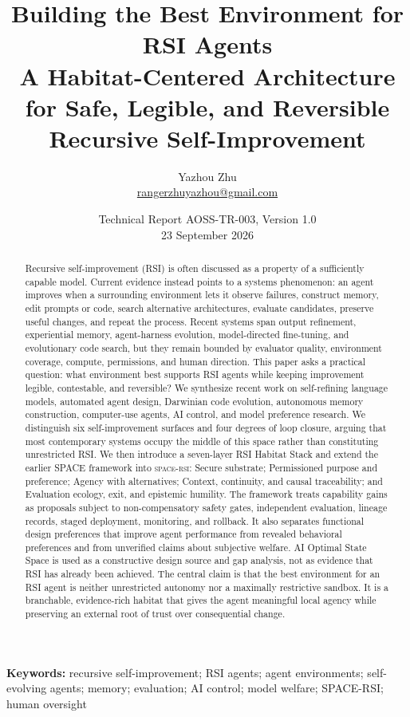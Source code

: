 \documentclass[11pt,a4paper]{article}
\title{\vspace{-1.2cm}\textbf{Building the Best Environment for RSI Agents}\\[0.35em]
\large A Habitat-Centered Architecture for Safe, Legible, and Reversible Recursive Self-Improvement}
\author{Yazhou Zhu\\\small\href{mailto:rangerzhuyazhou@gmail.com}{rangerzhuyazhou@gmail.com}}
\date{Technical Report AOSS-TR-003, Version 1.0\\23 September 2026}
\newcommand{\spaceRSI}{\textsc{space-rsi}}
\newcommand{\keywords}[1]{\par\smallskip\noindent\textbf{Keywords:} #1}
\begin{document}
\maketitle

\begin{abstract}
Recursive self-improvement (RSI) is often discussed as a property of a sufficiently capable model. Current evidence instead points to a systems phenomenon: an agent improves when a surrounding environment lets it observe failures, construct memory, edit prompts or code, search alternative architectures, evaluate candidates, preserve useful changes, and repeat the process. Recent systems span output refinement, experiential memory, agent-harness evolution, model-directed fine-tuning, and evolutionary code search, but they remain bounded by evaluator quality, environment coverage, compute, permissions, and human direction. This paper asks a practical question: what environment best supports RSI agents while keeping improvement legible, contestable, and reversible? We synthesize recent work on self-refining language models, automated agent design, Darwinian code evolution, autonomous memory construction, computer-use agents, AI control, and model preference research. We distinguish six self-improvement surfaces and four degrees of loop closure, arguing that most contemporary systems occupy the middle of this space rather than constituting unrestricted RSI. We then introduce a seven-layer RSI Habitat Stack and extend the earlier SPACE framework into \spaceRSI: Secure substrate; Permissioned purpose and preference; Agency with alternatives; Context, continuity, and causal traceability; and Evaluation ecology, exit, and epistemic humility. The framework treats capability gains as proposals subject to non-compensatory safety gates, independent evaluation, lineage records, staged deployment, monitoring, and rollback. It also separates functional design preferences that improve agent performance from revealed behavioral preferences and from unverified claims about subjective welfare. AI Optimal State Space is used as a constructive design source and gap analysis, not as evidence that RSI has already been achieved. The central claim is that the best environment for an RSI agent is neither unrestricted autonomy nor a maximally restrictive sandbox. It is a branchable, evidence-rich habitat that gives the agent meaningful local agency while preserving an external root of trust over consequential change.
\end{abstract}

\keywords{recursive self-improvement; RSI agents; agent environments; self-evolving agents; memory; evaluation; AI control; model welfare; SPACE-RSI; human oversight}
\end{document}
